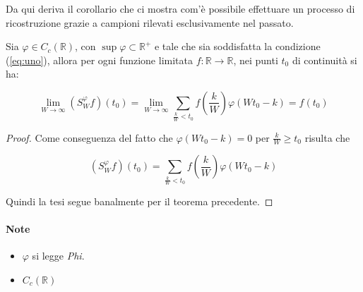 Da qui deriva il corollario che ci mostra com'è possibile effettuare un processo
di ricostruzione grazie a campioni rilevati esclusivamente nel passato.

\begin{corollary}
    Sia $\varphi \in C_c(\mathbb{R})$, con $\sup \varphi \subset \mathbb{R}^+$ e
    tale che sia soddisfatta la condizione (\ref{eq:uno}), allora per ogni funzione limitata
    $f: \mathbb{R} \rightarrow \mathbb{R}$, nei punti $t_0$ di continuità si ha:

    $$
        \lim_{W \rightarrow \infty} (S_W^{\varphi}f)(t_0) = \lim_{W \rightarrow \infty} \sum_{\frac{k}{W} < t_0} f(\frac{k}{W}) \varphi(Wt_0 - k) = f(t_0)
    $$
\end{corollary}

\begin{proof}
    Come conseguenza del fatto che $\varphi(Wt_0-k) = 0$ per $\frac{k}{W} \ge t_0$ risulta che

    $$
        (S_W^{\varphi}f)(t_0) = \sum_{\frac{k}{W} < t_0} f(\frac{k}{W}) \varphi(Wt_0 - k)
    $$

    Quindi la tesi segue banalmente per il teorema precedente.
\end{proof}

\paragraph{Note}
\begin{itemize}
    \item $\varphi$ si legge \textit{Phi}.
    \item $C_c(\mathbb{R})$ 
\end{itemize}